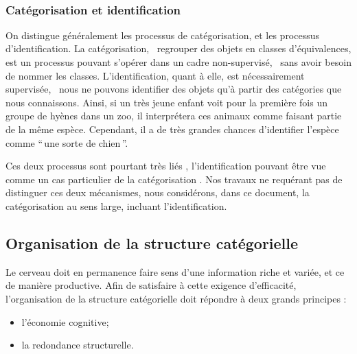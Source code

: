 \\


\subsubsection{Catégorisation et identification}

On distingue généralement les processus de catégorisation, et les processus d'identification.  La catégorisation, \ie~regrouper des objets en classes d'équivalences, est un processus pouvant s'opérer dans un cadre non-supervisé, \ie~sans avoir besoin de nommer les classes. L'identification, quant à elle, est nécessairement supervisée, \ie~nous ne pouvons identifier des objets qu'à partir des catégories que nous connaissons. Ainsi, si un très jeune enfant voit pour la première fois un groupe de hyènes dans un zoo, il interprétera ces animaux comme faisant partie de la même espèce. Cependant, il a de très grandes chances d’identifier l'espèce comme ``\,une sorte de chien\,''.


Ces deux processus sont pourtant très liés \citep{goldstone2003concepts}, l'identification pouvant être vue comme un cas particulier de la catégorisation \citep{schyns1998diagnostic}. Nos travaux ne requérant pas de distinguer ces deux mécanismes, nous considérons, dans ce document, la catégorisation au sens large, incluant l'identification.

\subsection{Organisation de la structure catégorielle}

Le cerveau doit en permanence faire sens d'une information riche et variée, et ce de manière productive. Afin de satisfaire à cette exigence d'efficacité, l'organisation  de la structure catégorielle doit répondre à deux grands principes \citep[p. 29]{rosch1978cognition}:

\begin{itemize}
\item l'économie cognitive;
\item la redondance structurelle.
\end{itemize}

